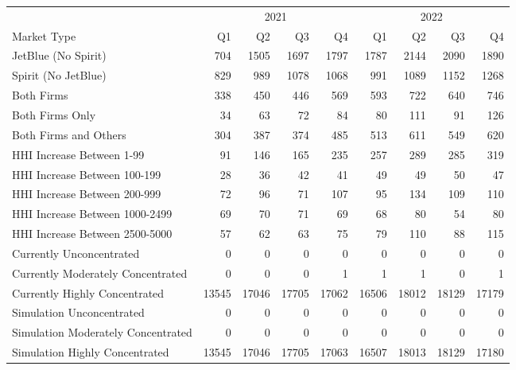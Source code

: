 
\begin{tabular}{lrrrrrrrr}
\toprule
\multicolumn{1}{c}{ } & \multicolumn{4}{c}{2021} & \multicolumn{4}{c}{2022} \\
\cmidrule(l{3pt}r{3pt}){2-5} \cmidrule(l{3pt}r{3pt}){6-9}
Market Type & Q1 & Q2 & Q3 & Q4 & Q1 & Q2 & Q3 & Q4\\
\midrule
JetBlue (No Spirit) & 704 & 1505 & 1697 & 1797 & 1787 & 2144 & 2090 & 1890\\
Spirit (No JetBlue) & 829 & 989 & 1078 & 1068 & 991 & 1089 & 1152 & 1268\\
Both Firms & 338 & 450 & 446 & 569 & 593 & 722 & 640 & 746\\
Both Firms Only & 34 & 63 & 72 & 84 & 80 & 111 & 91 & 126\\
Both Firms and Others & 304 & 387 & 374 & 485 & 513 & 611 & 549 & 620\\
HHI Increase Between 1-99 & 91 & 146 & 165 & 235 & 257 & 289 & 285 & 319\\
HHI Increase Between 100-199 & 28 & 36 & 42 & 41 & 49 & 49 & 50 & 47\\
HHI Increase Between 200-999 & 72 & 96 & 71 & 107 & 95 & 134 & 109 & 110\\
HHI Increase Between 1000-2499 & 69 & 70 & 71 & 69 & 68 & 80 & 54 & 80\\
HHI Increase Between 2500-5000 & 57 & 62 & 63 & 75 & 79 & 110 & 88 & 115\\
Currently Unconcentrated & 0 & 0 & 0 & 0 & 0 & 0 & 0 & 0\\
Currently Moderately Concentrated & 0 & 0 & 0 & 1 & 1 & 1 & 0 & 1\\
Currently Highly Concentrated & 13545 & 17046 & 17705 & 17062 & 16506 & 18012 & 18129 & 17179\\
Simulation Unconcentrated & 0 & 0 & 0 & 0 & 0 & 0 & 0 & 0\\
Simulation Moderately Concentrated & 0 & 0 & 0 & 0 & 0 & 0 & 0 & 0\\
Simulation Highly Concentrated & 13545 & 17046 & 17705 & 17063 & 16507 & 18013 & 18129 & 17180\\
\bottomrule
\end{tabular}
